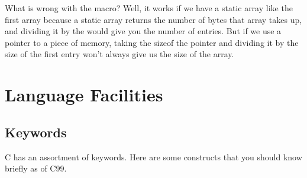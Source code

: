 What is wrong with the macro? Well, it works if we have a static array like the first array because  a static array returns the number of bytes that array takes up, and dividing it by the  would give you the number of entries. But if we use a pointer to a piece of memory, taking the sizeof the pointer and dividing it by the size of the first entry won't always give us the size of the array.

\section{Language Facilities}

\subsection{Keywords}

C has an assortment of keywords. Here are some constructs that you should know briefly as of C99.

